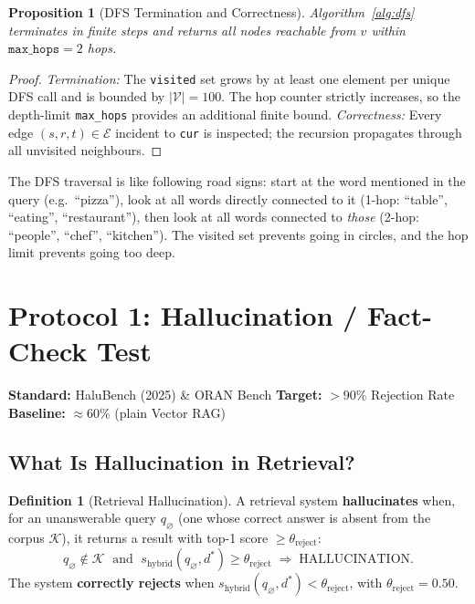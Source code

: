 \documentclass[12pt,a4paper]{article}
\theoremstyle{definition}
\newtheorem{definition}{Definition}[section]
\theoremstyle{plain}
\newtheorem{proposition}[theorem]{Proposition}
\theoremstyle{remark}
\begin{document}
\begin{proposition}[DFS Termination and Correctness]
\label{prop:dfs}
Algorithm~\ref{alg:dfs} terminates in finite steps and returns all
nodes reachable from $v$ within $\texttt{max\_hops}=2$ hops.
\end{proposition}
\begin{proof}
\textit{Termination:} The \texttt{visited} set grows by at least one
element per unique DFS call and is bounded by $|\mathcal{V}| = 100$.
The hop counter strictly increases, so the depth-limit \texttt{max\_hops}
provides an additional finite bound. \textit{Correctness:} Every edge
$(s,r,t) \in \mathcal{E}$ incident to \texttt{cur} is inspected; the
recursion propagates through all unvisited neighbours.
\end{proof}

\begin{tcolorbox}[laymanbox]
The DFS traversal is like following road signs: start at the word
mentioned in the query (e.g.\ ``pizza''), look at all words directly
connected to it (1-hop: ``table'', ``eating'', ``restaurant''), then
look at all words connected to \emph{those} (2-hop: ``people'',
``chef'', ``kitchen''). The visited set prevents going in circles, and
the hop limit prevents going too deep.
\end{tcolorbox}

\newpage
\section{Protocol 1: Hallucination / Fact-Check Test}

\begin{tcolorbox}
\textbf{Standard:} HaluBench (2025) \& ORAN Bench \hfill
\textbf{Target:} $>90\%$ Rejection Rate \hfill
\textbf{Baseline:} $\approx60\%$ (plain Vector RAG)
\end{tcolorbox}

\subsection{What Is Hallucination in Retrieval?}

\begin{definition}[Retrieval Hallucination]
\label{def:hallucination}
A retrieval system \textbf{hallucinates} when, for an unanswerable
query $q_\varnothing$ (one whose correct answer is absent from the
corpus $\mathcal{K}$), it returns a result with top-1 score
$\geq \theta_{\text{reject}}$:
\[
  q_\varnothing \notin \mathcal{K} \;\text{ and }\;
  s_{\text{hybrid}}(q_\varnothing, d^*) \geq \theta_{\text{reject}}
  \;\Longrightarrow\; \text{HALLUCINATION.}
\]
The system \textbf{correctly rejects} when
$s_{\text{hybrid}}(q_\varnothing, d^*) < \theta_{\text{reject}}$,
with $\theta_{\text{reject}} = 0.50$.
\end{definition}
\end{document}
